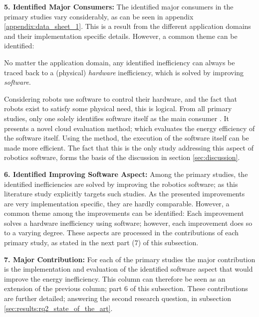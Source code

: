 \noindent\textbf{5. Identified Major Consumers:}
The identified major consumers in the primary studies vary considerably, as can be seen in appendix \ref{appendix:data_sheet_1}.
This is a result from the different application domains and their implementation specific details.
However, a common theme can be identified:

\vspace{2mm}

No matter the application domain, any identified inefficiency can always be traced back to a (physical) \textit{hardware} inefficiency, 
which is solved by improving \textit{software}.

\vspace{2mm}

Considering robots use software to control their hardware, and the fact that robots exist to satisfy some physical need, this is logical.
From all primary studies, only one solely identifies software itself as the main consumer \cite{hou2017novel_cloud_evaluation_model}.
It presents a novel cloud evaluation method; which evaluates the energy efficiency of the software itself.
Using the method, the execution of the software itself can be made more efficient. 
The fact that this is the only study addressing this aspect of robotics software, forms the basis of the discussion in section \ref{sec:discussion}.

\vspace{5mm}

\noindent\textbf{6. Identified Improving Software Aspect:}
Among the primary studies, the identified inefficiencies are solved by improving the robotics software;
as this literature study explicitly targets such studies.
As the presented improvements are very implementation specific, they are hardly comparable.
However, a common theme among the improvements can be identified:
Each improvement solves a hardware inefficiency using software; however, each improvement does so to a varying degree. 
These aspects are processed in the contributions of each primary study, 
as stated in the next part (7) of this subsection.

\newpage

\noindent\textbf{7. Major Contribution:}
For each of the primary studies the major contribution is the implementation and evaluation of the identified software aspect that would
improve the energy inefficiency. 
This column can therefore be seen as an extension of the previous column; part 6 of this subsection.
These contributions are further detailed; answering the second research question, in subsection \ref{sec:results:rq2_state_of_the_art}.

